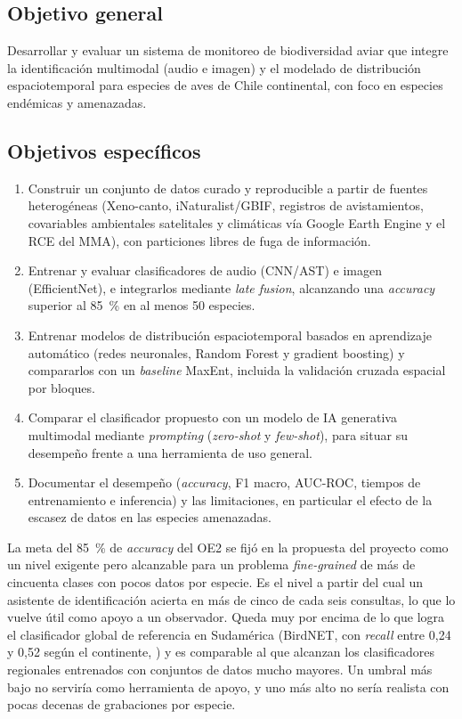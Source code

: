 \subsection*{Objetivo general}

Desarrollar y evaluar un sistema de monitoreo de biodiversidad aviar que
integre la identificación multimodal (audio e imagen) y el modelado de
distribución espaciotemporal para especies de aves de Chile continental, con
foco en especies endémicas y amenazadas.

\subsection*{Objetivos específicos}

\begin{enumerate}[label=\textbf{OE\arabic*.}, leftmargin=*, itemsep=3pt]
  \item Construir un conjunto de datos curado y reproducible a partir de
        fuentes heterogéneas (Xeno-canto, iNaturalist/GBIF, registros de
        avistamientos, covariables ambientales satelitales y climáticas vía
        Google Earth Engine y el RCE del MMA), con particiones libres de fuga
        de información.
  \item Entrenar y evaluar clasificadores de audio (CNN/AST) e imagen
        (EfficientNet), e integrarlos mediante \textit{late fusion},
        alcanzando una \textit{accuracy} superior al \SI{85}{\percent} en al
        menos 50 especies.
  \item Entrenar modelos de distribución espaciotemporal basados en
        aprendizaje automático (redes neuronales, Random Forest y gradient boosting) y
        compararlos con un \textit{baseline} MaxEnt, incluida la validación
        cruzada espacial por bloques.
  \item Comparar el clasificador propuesto con un modelo de IA generativa
        multimodal mediante \textit{prompting} (\textit{zero-shot} y
        \textit{few-shot}), para situar su desempeño frente a una herramienta
        de uso general.
  \item Documentar el desempeño (\textit{accuracy}, F1 macro, AUC-ROC, tiempos
        de entrenamiento e inferencia) y las limitaciones, en particular el
        efecto de la escasez de datos en las especies amenazadas.
\end{enumerate}

La meta del \SI{85}{\percent} de \textit{accuracy} del OE2 se fijó en la
propuesta del proyecto como un nivel exigente pero alcanzable para un
problema \textit{fine-grained} de más de cincuenta clases con pocos datos
por especie. Es el nivel a partir del cual un asistente de identificación
acierta en más de cinco de cada seis consultas, lo que lo vuelve útil como
apoyo a un observador. Queda muy por encima de lo que logra el clasificador
global de referencia en Sudamérica (BirdNET, con \textit{recall} entre 0,24
y 0,52 según el continente, ) y es comparable al que
alcanzan los clasificadores regionales entrenados con conjuntos de datos
mucho mayores. Un umbral más bajo no serviría como herramienta de apoyo, y uno
más alto no sería realista con pocas decenas de grabaciones por especie.

